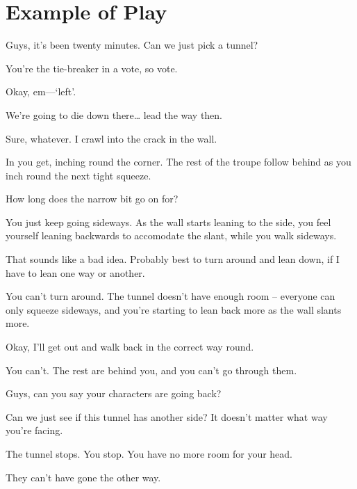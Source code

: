 \section{Example of Play}

\begin{multicols}{2}

\begin{description}\sf
  \item[Player 3:]
  Guys, it's been twenty minutes.
  Can  we just pick a tunnel?
  \item[\Glsentrytext{gm}:]
  You're the tie-breaker in a vote, so vote.
  \item[Player 3:]
  Okay, em---`left'.
  \item[Player 2:]
  We're going to die down there\ldots
  lead the way then.
  \item[Player 3:]
  Sure, whatever.
  I crawl into the crack in the wall.
  \item[\Glsentrytext{gm}:]
  In you get, inching round the corner.
  The rest of the troupe follow behind as you inch round the next tight squeeze.
  \item[Player 3:]
  How long does the narrow bit go on for?
  \item[\Glsentrytext{gm}:]
  You just keep going sideways.
  As the wall starts leaning to the side, you feel yourself leaning backwards to accomodate the slant, while you walk sideways.
  \item[Player 3:]
  That sounds like a bad idea.
  Probably best to turn around and lean down, if I have to lean one way or another.
  \item[\Glsentrytext{gm}:]
  You can't turn around.
  The tunnel doesn't have enough room -- everyone can only squeeze sideways, and you're starting to lean back more as the wall slants more.
  \item[Player 3:]
  Okay, I'll get out and walk back in the correct way round.
  \item[\Glsentrytext{gm}:]
  You can't.
  The rest are behind you, and you can't go through them.
  \item[Player 3:]
  Guys, can you say your characters are going back?
  \item[Player 2:]
  Can we just see if this tunnel has another side?
  It doesn't matter what way you're facing.
  \item[\Glsentrytext{gm}:]
  The tunnel stops.
  You stop.
  You have no more room for your head.
  \item[Player 1:]
  They can't have gone the other way.

\end{description}
\end{multicols}
